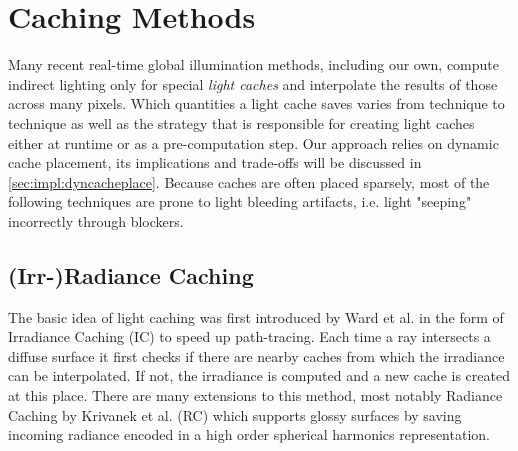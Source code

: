 \documentclass[thesis.tex]{subfiles}
\begin{document}
\section{Caching Methods}
Many recent real-time global illumination methods, including our own, compute indirect lighting only for special \emph{light caches} and interpolate the results of those across many pixels.
Which quantities a light cache saves varies from technique to technique as well as the strategy that is responsible for creating light caches either at runtime or as a pre-computation step.
Our approach relies on dynamic cache placement, its implications and trade-offs will be discussed in \autoref{sec:impl:dyncacheplace}.
Because caches are often placed sparsely, most of the following techniques are prone to light bleeding artifacts, i.e. light "seeping" incorrectly through blockers.

\subsection{(Irr-)Radiance Caching}
The basic idea of light caching was first introduced by Ward et al. \cite{bib:irradiancecaching} in the form of Irradiance Caching (IC) to speed up path-tracing.
Each time a ray intersects a diffuse surface it first checks if there are nearby caches from which the irradiance can be interpolated.
If not, the irradiance is computed and a new cache is created at this place.
There are many extensions to this method, most notably Radiance Caching by Krivanek et al. \cite{bib:radiancecaching} (RC) which supports glossy surfaces by saving incoming radiance encoded in a high order spherical harmonics representation.
\end{document}
